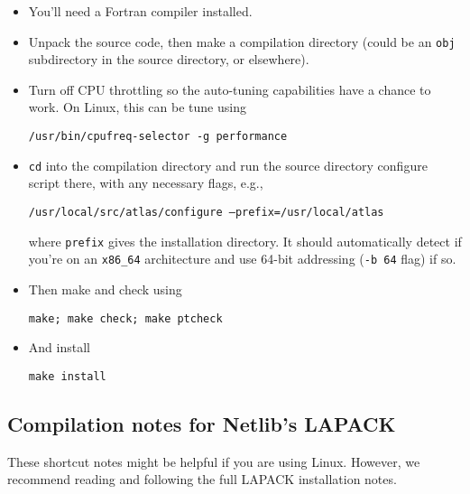 \documentclass[12pt]{article}
\begin{document}
   \begin{itemize}
   
   \item
   You'll need a Fortran compiler installed.

   \item
   Unpack the source code, then make a compilation directory (could
   be an {\tt obj} subdirectory in the source directory, or elsewhere).

   \item
   Turn off CPU throttling so the auto-tuning capabilities have a chance
   to work.  On Linux, this can be tune using

     {\tt /usr/bin/cpufreq-selector -g performance}

   \item
   {\tt cd} into the compilation directory and run the source
   directory configure script there, with any necessary flags, e.g.,
 
     {\tt /usr/local/src/atlas/configure --prefix=/usr/local/atlas}

   where {\tt prefix} gives the installation directory.
   It should automatically detect if you're on an {\tt x86\_64} 
   architecture and use 64-bit addressing ({\tt -b 64} flag) if so.

   \item
   Then make and check using

     {\tt make; make check; make ptcheck}

   \item
   And install

     {\tt make install}
   \end{itemize}

\subsection{Compilation notes for Netlib's LAPACK}
   These shortcut notes might be helpful if you are using Linux.  However,
   we recommend reading and following the full LAPACK installation notes.
\end{document}
